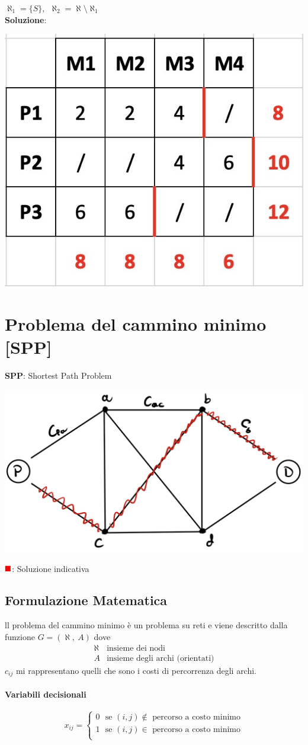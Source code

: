 \documentclass[12pt,a4paper]{article}
\begin{document}
$\aleph_1=\{S\}, \ \ \aleph_2 = \aleph \setminus \aleph_1$\\
\textbf{Soluzione}:
\begin{center}
\includegraphics[width=0.4\columnwidth]{img/pb_maxflow_problemino_tab.JPG}\\
\end{center}

\clearpage
\section{Problema del cammino minimo [SPP]}
\textbf{SPP}: Shortest Path Problem
\begin{center}
\includegraphics[width=0.6\columnwidth]{img/spp.jpeg}\\
\end{center}
$\textcolor{red}{\blacksquare}$: Soluzione indicativa
\subsection{Formulazione Matematica}
ll problema del cammino minimo è un problema su reti e viene descritto dalla funzione $G=(\aleph,\ A)$ dove $$\begin{array}{ll}\aleph & \text{insieme dei nodi}\\A & \text{insieme degli archi (orientati)}\end{array}$$
$c_{ij}$ mi rappresentano quelli che sono i costi di percorrenza degli archi.
\paragraph{Variabili decisionali} $$x_{ij} = \begin{cases}
0 \ \ \ \text{se $(i,j)\not \in$ percorso a costo minimo}\\
1 \ \ \ \text{se $(i,j) \in$ percorso a costo minimo}\\
\end{cases}$$
\end{document}
